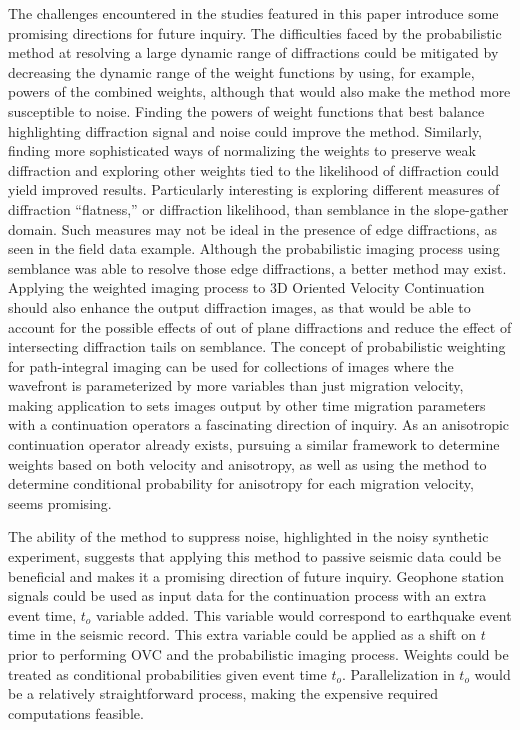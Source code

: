 The challenges encountered in the studies featured in this paper introduce some promising directions for future inquiry. The difficulties faced by the probabilistic method at resolving a large dynamic range of diffractions could be mitigated by decreasing the dynamic range of the weight functions by using, for example, powers of the combined weights, although that would also make the method more susceptible to noise. Finding the powers of weight functions that best balance highlighting diffraction signal and noise could improve the method.  Similarly, finding more sophisticated ways of normalizing the weights to preserve weak diffraction and exploring other weights tied to the likelihood of diffraction could yield improved results.  Particularly interesting is exploring different measures of diffraction ``flatness,'' or diffraction likelihood, than semblance in the slope-gather domain. Such measures may not be ideal in the presence of edge diffractions, as seen in the field data example.  Although the probabilistic imaging process using semblance was able to resolve those edge diffractions, a better method may exist.  Applying the weighted imaging process to 3D Oriented Velocity Continuation should also enhance the output diffraction images, as that would be able to account for the possible effects of out of plane diffractions and reduce the effect of intersecting diffraction tails on semblance. The concept of probabilistic weighting for path-integral imaging can be used for collections of images where the wavefront is parameterized by more variables than just migration velocity, making application to sets images output by other time migration parameters with a continuation operators a fascinating direction of inquiry.  As an anisotropic continuation operator already exists, pursuing a similar framework to determine weights based on both velocity and anisotropy, as well as using the method to determine  conditional probability for anisotropy for each migration velocity, seems promising.

The ability of the method to suppress noise, highlighted in the noisy synthetic experiment, suggests that applying this method to passive seismic data could be beneficial and makes it a promising direction of future inquiry.  Geophone station signals could be used as input data for the continuation process with an extra event time, $t_o$ variable added. This variable would correspond to earthquake event time in the seismic record.  This extra variable could be applied as a shift on $t$ prior to performing OVC and the probabilistic imaging process.  Weights could be treated as conditional probabilities given event time $t_o$.  Parallelization in $t_o$ would be a relatively straightforward process, making the expensive required computations feasible.


